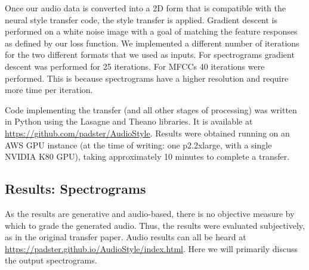 \documentclass{article}
\begin{document}
Once our audio data is converted into a 2D form that is compatible with the neural style transfer code, the style transfer is applied. Gradient descent is performed on a white noise image with a goal of matching the feature responses as defined by our loss function. We implemented a different number of iterations for the two different formats that we used as inputs. For spectrograms gradient descent was performed for 25 iterations. For MFCCs 40 iterations were performed. This is because spectrograms have a higher resolution and require more time per iteration.

Code implementing the transfer (and all other stages of processing) was written in Python using the Lasagne and Theano libraries. It is available at \url{https://github.com/padster/AudioStyle}. Results were obtained running on an AWS GPU instance (at the time of writing: one p2.2xlarge, with a single NVIDIA K80 GPU), taking approximately 10 minutes to complete a transfer. 

\subsection{Results: Spectrograms}

As the results are generative and audio-based, there is no objective measure by which to grade the generated audio. Thus, the results were evaluated subjectively, as in the original transfer paper. Audio results can all be heard at \url{https://padster.github.io/AudioStyle/index.html}. Here we will primarily discuss the output spectrograms.
\end{document}
